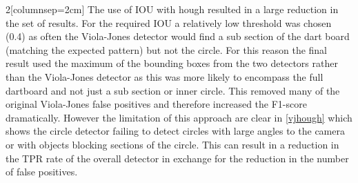 \documentclass{article}
\begin{document}
\begin{multicols}{2}[columnsep=2cm]
The use of IOU with hough resulted in a large reduction in the set of results.
For the required IOU a relatively low threshold was chosen (0.4) as often the
Viola-Jones detector would find a sub section of the dart board (matching the
expected pattern) but not the circle.  For this reason the final result used
the maximum of the bounding boxes from the two detectors rather than the
Viola-Jones detector as this was more likely to encompass the full dartboard
and not just a sub section or inner circle. This removed many of the original
Viola-Jones false positives and therefore increased the F1-score dramatically.
However the limitation of this approach are clear in \ref{vjhough} which shows
the circle detector failing to detect circles with large angles to the camera
or with objects blocking sections of the circle.  This can result in a
reduction in the TPR rate of the overall detector in exchange for the reduction
in the number of false positives.


\end{multicols}
\end{document}

